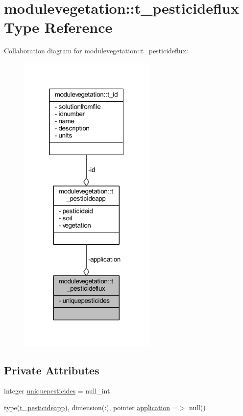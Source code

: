 \hypertarget{structmodulevegetation_1_1t__pesticideflux}{}\section{modulevegetation\+:\+:t\+\_\+pesticideflux Type Reference}
\label{structmodulevegetation_1_1t__pesticideflux}


Collaboration diagram for modulevegetation\+:\+:t\+\_\+pesticideflux\+:\nopagebreak
\begin{figure}[H]
\begin{center}
\leavevmode
\includegraphics[width=193pt]{structmodulevegetation_1_1t__pesticideflux__coll__graph}
\end{center}
\end{figure}
\subsection*{Private Attributes}
\begin{DoxyCompactItemize}
\item 
integer \mbox{\hyperlink{structmodulevegetation_1_1t__pesticideflux_a5f4c8778d0eb4fd13f1004b690e351d9}{uniquepesticides}} = null\+\_\+int
\item 
type(\mbox{\hyperlink{structmodulevegetation_1_1t__pesticideapp}{t\+\_\+pesticideapp}}), dimension(\+:), pointer \mbox{\hyperlink{structmodulevegetation_1_1t__pesticideflux_a91a7dbc8184531a18b61ced180c6df6a}{application}} =$>$ null()
\end{DoxyCompactItemize}


